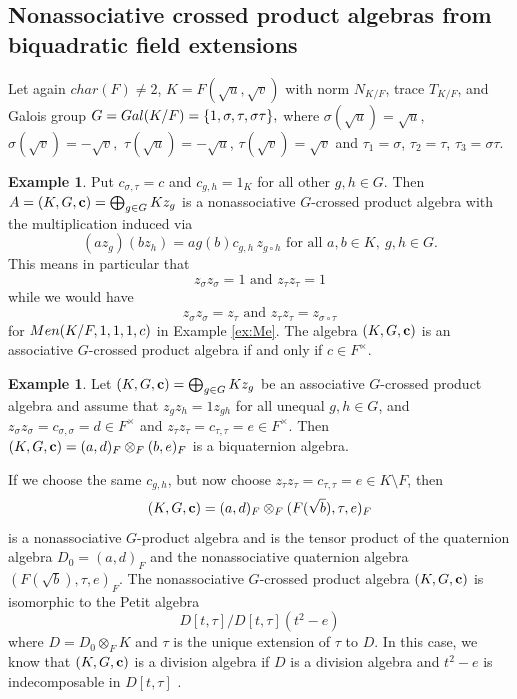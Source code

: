 \documentclass[11pt]{amsart}
\theoremstyle{plain}
\theoremstyle{definition}
\newtheorem{example}[theorem]{Example}
\begin{document}
\subsection{Nonassociative crossed product algebras from biquadratic field extensions}

  Let again $char(F)\not=2$, $K = F(\sqrt{u}, \sqrt{v})$  with norm $N_{K/F}$, trace $T_{K/F}$, and Galois group
$G={\rm Gal}(K/F) = \{1, \sigma, \tau, \sigma \tau\},$ where
$\sigma(\sqrt{u}) = \sqrt{u},$ $\sigma(\sqrt{v}) = -\sqrt{v},$
$\tau(\sqrt{u}) = -\sqrt{u}$, $\tau(\sqrt{v}) = \sqrt{v}$ and $\tau_1=\sigma$, $\tau_2=\tau$, $\tau_3=\sigma\tau$.

\begin{example}\label{ex: cross}
Put $c_{\sigma,\tau}=c$ and $c_{g,h}=1_K$ for all other $g,h\in G$.
Then $A=(K, G,  {\bf c})=\bigoplus_{g \in G} K z_{g}$ is a nonassociative $G$-crossed product algebra
with the multiplication induced via
\[
(a z_g)(b z_h) =  a g(b) c_{g,h}\, z_{g\circ h}\text{ for all }
 a,b \in K,\ g,h \in G.
\]
This means in particular that
$$ z_\sigma z_\sigma  = 1 \text{ and } z_\tau z_\tau  = 1$$
while we would have
$$ z_\sigma z_\sigma  = z_{\tau} \text{ and } z_\tau z_\tau  =  z_{\sigma\circ \tau}$$
 for  ${\rm Men}(K/F,1,1,1,c)$ in Example \ref{ex:Me}.
The algebra $(K, G,  {\bf c})$ is an associative $G$-crossed product algebra if and only if $c\in F^\times$.
\end{example}

\begin{example}
Let
$(K, G,  {\bf c})=\bigoplus_{g \in G} K z_{g}$ be an associative $G$-crossed product algebra  and assume that $z_g z_h=1 z_{gh}$ for all unequal $g,h\in G$, and $z_\sigma z_\sigma =c_{\sigma,\sigma}=d\in F^\times$ and
$z_\tau z_\tau =c_{\tau,\tau}=e\in F^\times$.
 Then $(K, G,  {\bf c})=(a,d)_F\otimes_F (b,e)_F$ is a biquaternion algebra.

If we choose the same $c_{g,h}$, but now choose $z_\tau z_\tau=c_{\tau,\tau}=e\in K\setminus F$, then
$$(K, G,  {\bf c})=(a,d)_F\otimes_F (F(\sqrt{b}),\tau,e)_F$$
 is a nonassociative $G$-product algebra and is the tensor product of the quaternion algebra $D_0=(a,d)_F$ and  the nonassociative
quaternion algebra $(F(\sqrt{b}),\tau,e)_F$. The nonassociative $G$-crossed product  algebra $(K, G,  {\bf c})$ is isomorphic to the Petit algebra $$D[t,\tau]/D[t,\tau](t^2-e)$$ where $D=D_0\otimes_F K$ and $\tau$ is the unique extension of $\tau$ to $D$. In this case, we know that $(K, G,  {\bf c})$ is a division algebra if $D$ is a division algebra and $t^2-e$ is indecomposable in $D[t,\tau]$ \cite{P66}.
\end{example}
\end{document}
